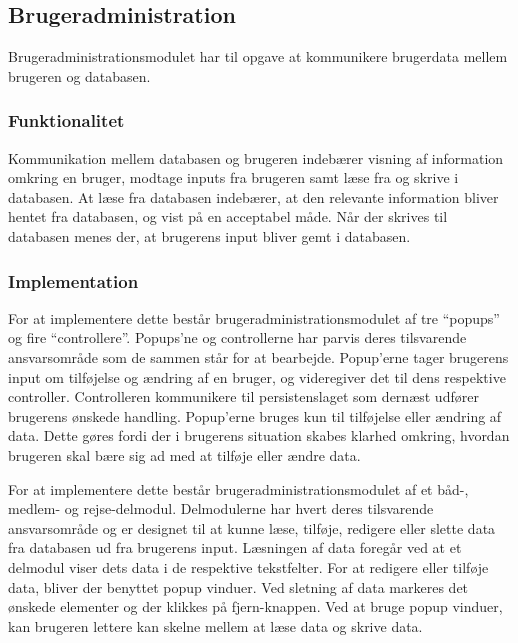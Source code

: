 \subsection{Brugeradministration}
\label{sub:Brugeradministration}

Brugeradministrationsmodulet har til opgave at kommunikere brugerdata mellem brugeren og databasen.

\subsubsection{Funktionalitet}
\label{ssub:Brugeradministration_funktionalitet}

Kommunikation mellem databasen og brugeren indebærer visning af information omkring en bruger, modtage inputs fra brugeren samt læse fra og skrive i databasen. At læse fra databasen indebærer, at den relevante information bliver hentet fra databasen, og vist på en acceptabel måde. Når der skrives til databasen menes der, at brugerens input bliver gemt i databasen. 

\subsubsection{Implementation}
\label{ssub:Brugeradministration_implementation}

For at implementere dette består brugeradministrationsmodulet af tre \enquote{popups} og fire \enquote{controllere}. Popups'ne og controllerne har parvis deres tilsvarende ansvarsområde som de sammen står for at bearbejde. Popup'erne tager brugerens input om tilføjelse og ændring af en bruger, og videregiver det til dens respektive controller. Controlleren kommunikere til persistenslaget som dernæst udfører brugerens ønskede handling. Popup'erne bruges kun til tilføjelse eller ændring af data. Dette gøres fordi der i brugerens situation skabes klarhed omkring, hvordan brugeren skal bære sig ad med at tilføje eller ændre data.

For at implementere dette består brugeradministrationsmodulet af et båd-, medlem- og rejse-delmodul. Delmodulerne har hvert deres tilsvarende ansvarsområde og er designet til at kunne læse, tilføje, redigere eller slette data fra databasen ud fra brugerens input. Læsningen af data foregår ved at et delmodul viser dets data i de respektive tekstfelter. For at redigere eller tilføje data, bliver der benyttet popup vinduer. Ved sletning af data markeres det ønskede elementer og der klikkes på fjern-knappen. Ved at bruge popup vinduer, kan brugeren lettere kan skelne mellem at læse data og skrive data.
